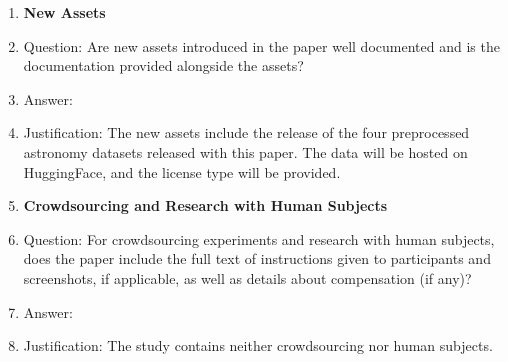 \begin{enumerate}
\item {\bf New Assets}
    \item[] Question: Are new assets introduced in the paper well documented and is the documentation provided alongside the assets?
    \item[] Answer: \answerYes{} %
    \item[] Justification: The new assets include the release of the four preprocessed astronomy datasets released with this paper. The data will be hosted on HuggingFace, and the license type will be provided. 

\item {\bf Crowdsourcing and Research with Human Subjects}
    \item[] Question: For crowdsourcing experiments and research with human subjects, does the paper include the full text of instructions given to participants and screenshots, if applicable, as well as details about compensation (if any)? 
    \item[] Answer: \answerNA{} %
    \item[] Justification: The study contains neither crowdsourcing nor human subjects. 


\end{enumerate}
